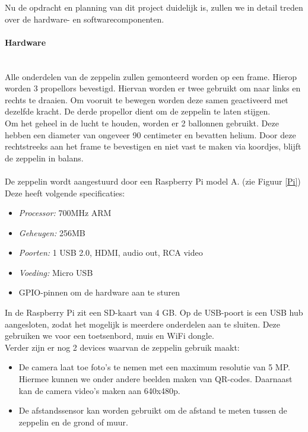 \documentclass{peno-opdracht2}
\begin{document}
\maketitle

Nu de opdracht en planning van dit project duidelijk is, zullen we in detail treden over de hardware- en softwarecomponenten. 
\paragraph{Hardware} ~\\
Alle onderdelen van de zeppelin zullen gemonteerd worden op een frame. Hierop worden 3 propellors bevestigd. Hiervan worden er twee gebruikt om naar links en rechts te draaien. Om vooruit te bewegen worden deze samen geactiveerd met dezelfde kracht. De derde propellor dient om de zeppelin te laten stijgen. ~\\

Om het geheel in de lucht te houden, worden er 2 ballonnen gebruikt. Deze hebben een diameter van ongeveer 90 centimeter en bevatten helium. Door deze rechtstreeks aan het frame te bevestigen en niet vast te maken via koordjes, blijft de zeppelin in balans.\\
\\
De zeppelin wordt aangestuurd door een Raspberry Pi model A. (zie Figuur \ref{Pi}) Deze heeft volgende specificaties: 
\begin{itemize}
	\item \emph{Processor:} 700MHz ARM
	\item \emph{Geheugen:} 256MB 
	\item \emph{Poorten:} 1 USB 2.0, HDMI, audio out, RCA video
	\item \emph{Voeding:} Micro USB
	\item GPIO-pinnen om de hardware aan te sturen
\end{itemize}

In de Raspberry Pi zit een SD-kaart van 4 GB. Op de USB-poort is een USB hub aangesloten, zodat het mogelijk is meerdere onderdelen aan te sluiten. Deze gebruiken we voor een toetsenbord, muis en WiFi dongle. \\

Verder zijn er nog 2 devices waarvan de zeppelin gebruik maakt:
\begin{itemize}
	\item De camera laat toe foto's te nemen met een maximum resolutie van 5 MP. Hiermee kunnen we onder andere beelden maken van QR-codes. Daarnaast kan de camera video's maken aan 640x480p. 
	\item De afstandssensor kan worden gebruikt om de afstand te meten tussen de zeppelin en de grond of muur.\\
\end{itemize}
\end{document}
